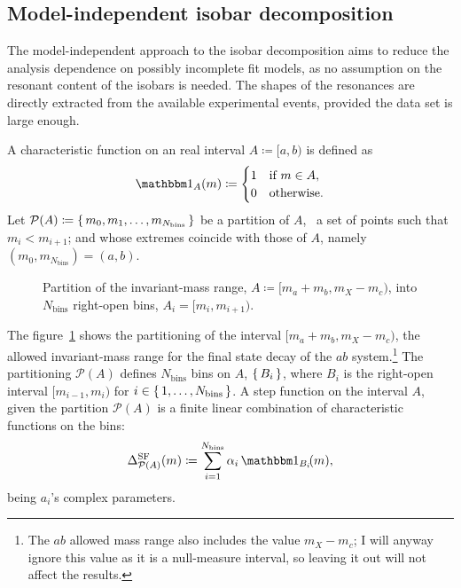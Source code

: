 \subsection{Model-independent isobar decomposition}
\label{sec:model_independent_isobar_decomposition}

    The model-independent approach to the isobar decomposition aims to reduce the analysis dependence on possibly incomplete fit models, as no assumption on the resonant content of the isobars is needed.
    The shapes of the resonances are directly extracted from the available experimental events, provided the data set is large enough.
    

    A characteristic function on an real interval $A \coloneqq [a,b)$ is defined as
    \begin{equation}
        \Characteristic_A(m) \coloneqq 
        \begin{cases}
            1 &\text{if }m \in A, \\
            0 &\text{otherwise}.
        \end{cases}
    \end{equation}
    Let $\mathcal{P}(A) \coloneqq \set{m_0, m_1,\dots, m_{N_\text{bins}}}$ be a partition of $A$, \ie~a set of points such that $m_{i} < m_{i+1}$; and whose extremes coincide with those of $A$, namely $(m_0, m_{N_\text{bins}}) = (a, b)$.
    \begin{figure}
        \centering
        
        \caption{Partition of the invariant-mass range, $A \coloneqq [m_a+m_b,m_X - m_c)$, into $N_\text{bins}$ right-open bins, $A_i = [m_i, m_{i+1})$.}
        \label{fig:invariant-mass-partition}
    \end{figure}
    The figure~\ref{fig:invariant-mass-partition} shows the partitioning of the interval $[m_a+m_b,m_X-m_c)$, the allowed invariant-mass range for the final state decay of the $ab$ system.\footnote{The $ab$ allowed mass range also includes the value $m_X - m_c$; I will anyway ignore this value as it is a null-measure interval, so leaving it out will not affect the results.}
    The partitioning $\mathcal{P}(A)$ defines $N_\text{bins}$ bins on $A$, $\set{B_i}$, where $B_i$ is the right-open interval $[m_{i-1},m_i)$ for $i\in\set{1,\dots, N_\text{bins}}$.
    A step function on the interval $A$, given the partition $\mathcal{P}(A)$ is a finite linear combination of characteristic functions on the bins:
    \begin{equation}\label{eq:step_dynamic_shape}
        \Delta_{\mathcal{P}(A)}^{\text{SF}}(m) \coloneqq \sum_{i = 1}^{N_\text{bins}} \alpha_i\, \Characteristic_{B_i}\!(m),
    \end{equation}
    being $a_i$'s complex parameters.


